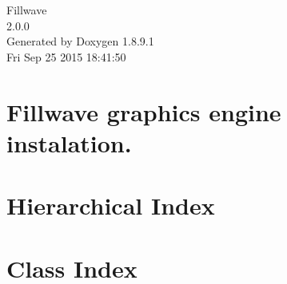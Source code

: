 \documentclass[twoside]{book}
\newcommand{\+}{\discretionary{\mbox{\scriptsize$\hookleftarrow$}}{}{}}
\newcommand{\clearemptydoublepage}{%
  \newpage{\pagestyle{empty}\cleardoublepage}%
}
\begin{document}
\hypersetup{pageanchor=false,
             bookmarks=true,
             bookmarksnumbered=true,
             pdfencoding=unicode
            }
\begin{titlepage}
\vspace*{7cm}
\begin{center}%
{\Large Fillwave \\[1ex]\large 2.\+0.\+0 }\\
\vspace*{1cm}
{\large Generated by Doxygen 1.8.9.1}\\
\vspace*{0.5cm}
{\small Fri Sep 25 2015 18:41:50}\\
\end{center}
\end{titlepage}
\clearemptydoublepage
\tableofcontents
\clearemptydoublepage
{}
\hypersetup{pageanchor=true}

\chapter{Fillwave graphics engine instalation.}
\label{index}\hypertarget{index}{}
\chapter{Hierarchical Index}

\chapter{Class Index}

\end{document}
